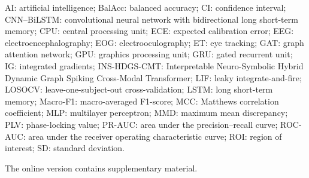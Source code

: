 \documentclass[pdflatex,sn-basic,Numbered,twocolumn,iicol]{sn-jnl}
\theoremstyle{thmstyleone}%
\theoremstyle{thmstyletwo}%
\theoremstyle{thmstylethree}%
\begin{document}
\backmatter

AI: artificial intelligence; BalAcc: balanced accuracy; CI: confidence interval; CNN--BiLSTM: convolutional neural network with bidirectional long short-term memory; CPU: central processing unit; ECE: expected calibration error; EEG: electroencephalography; EOG: electrooculography; ET: eye tracking; GAT: graph attention network; GPU: graphics processing unit; GRU: gated recurrent unit; IG: integrated gradients; INS-HDGS-CMT: Interpretable Neuro-Symbolic Hybrid Dynamic Graph Spiking Cross-Modal Transformer; LIF: leaky integrate-and-fire; LOSOCV: leave-one-subject-out cross-validation; LSTM: long short-term memory; Macro-F1: macro-averaged F1-score; MCC: Matthews correlation coefficient; MLP: multilayer perceptron; MMD: maximum mean discrepancy; PLV: phase-locking value; PR-AUC: area under the precision--recall curve; ROC-AUC: area under the receiver operating characteristic curve; ROI: region of interest; SD: standard deviation.

The online version contains supplementary material.
\end{document}
